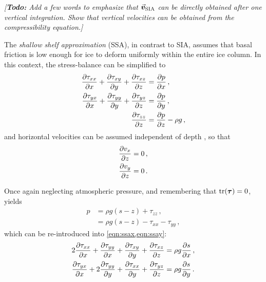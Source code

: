 \documentclass{article}
\newcommand{\todo}[1]{\emph{[\textbf{Todo:} #1]}}
\newcommand{\vect}[1]{\va*{#1}} %
\newcommand{\tens}[1]{\vb*{#1}} %
\newcommand{\DST}[0]{\tens{\tau}}       %
\newcommand{\vv}[0]{\vect{v}}           %
\newcommand{\vsia}[0]{\vv_{\mathrm{SIA}}}   %
\begin{document}
\todo{Add a few words to emphasize that $\vsia$ can be directly obtained
      after one vertical integration. Show that vertical velocities can be
      obtained from the compressibility equation.}

The \emph{shallow shelf approximation} (SSA), in contrast to SIA,
assumes that
basal friction is low enough for ice to deform uniformly within the entire ice column. In this context, the stress-balance can
be simplified to \citep[Eqs.~4.10--4.12]{Weis.etal.1999}
\begin{subequations}
\label{eqn:ssa}
\begin{align}
    \label{eqn:ssax}
    \pdv{\tau_{xx}}{x} + \pdv{\tau_{xy}}{y} + \pdv{\tau_{xz}}{z}
        &= \pdv{p}{x} \,, \\
    \label{eqn:ssay}
    \pdv{\tau_{yx}}{x} + \pdv{\tau_{yy}}{y} + \pdv{\tau_{yz}}{z}
        &= \pdv{p}{y} \,, \\
    \label{eqn:ssaz}
    \pdv{\tau_{zz}}{z} &= \pdv{p}{z} - \rho g \,,
\end{align}
\end{subequations}
and horizontal velocities can be assumed independent of depth
\citep[Eq.~4.22]{Weis.etal.1999}, so that
\begin{align}
    \pdv{v_x}{z} &= 0 \,, \\
    \pdv{v_y}{z} &= 0 \,.
\end{align}

Once again neglecting atmospheric pressure, and remembering that $\tr(\DST)=0$,
 yields
\begin{align}
    p &= \rho g (s-z) + \tau_{zz} \,, \\
      &= \rho g (s-z) - \tau_{xx} - \tau_{yy} \,,
\end{align}
which can be re-introduced into \cref{eqn:ssax,eqn:ssay}:
\begin{subequations}
\begin{align}
    2\pdv{\tau_{xx}}{x} + \pdv{\tau_{yy}}{x} + \pdv{\tau_{xy}}{y}
        + \pdv{\tau_{xz}}{z} &= \rho g \pdv{s}{x} \,, \\
    \pdv{\tau_{yx}}{x} + 2\pdv{\tau_{yy}}{y} + \pdv{\tau_{xx}}{y}
        + \pdv{\tau_{yz}}{z} &= \rho g \pdv{s}{y} \,.
\end{align}
\end{subequations}
\end{document}
